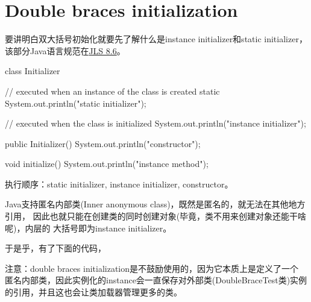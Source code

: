 ﻿\section[Double braces initialization]{Double braces initialization}
要讲明白双大括号初始化就要先了解什么是instance initializer和static initializer，
该部分Java语言规范在\href{http://docs.oracle.com/javase/specs/jls/se7/html/jls-8.html#jls-8.6}{JLS 8.6}。

\begin{javacode}
class Initializer {

  // executed when an instance of the class is created
  static {
    System.out.println("static initializer");
  }

  // executed when the class is initialized
  {
    System.out.println("instance initializer");
  }

  public Initializer() {
    System.out.println("constructor");
  }

  void initialize() {
    System.out.println("instance method");
  }
}
\end{javacode}

执行顺序：static initializer, instance initializer, constructor。

Java支持匿名内部类(Inner anonymous class)，既然是匿名的，就无法在其他地方引用，
因此也就只能在创建类的同时创建对象(毕竟，类不用来创建对象还能干啥呢)，内层的
大括号即为instance initializer。

于是乎，有了下面的代码，


注意：double braces initialization是不鼓励使用的，因为它本质上是定义了一个
匿名内部类，因此实例化的instance会一直保存对外部类(DoubleBraceTest类)实例
的引用，并且这也会让类加载器管理更多的类。